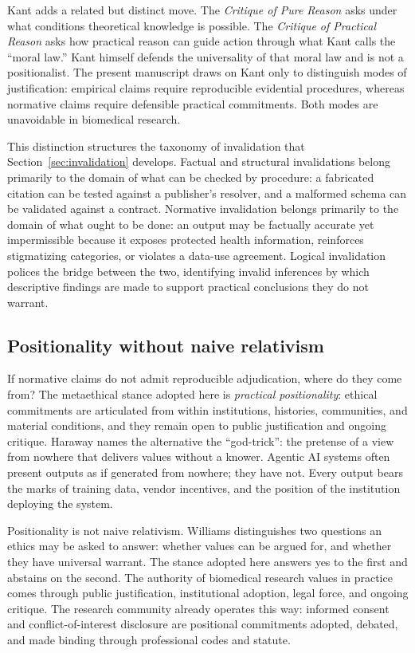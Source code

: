 \documentclass[11pt,letterpaper]{article}
\begin{document}
Kant adds a related but distinct move. The \emph{Critique of Pure Reason}
\cite{kant1781critique} asks under what conditions theoretical knowledge
is possible. The \emph{Critique of Practical Reason} \cite{kant1788practical}
asks how practical reason can guide action through what Kant calls the
``moral law.'' Kant himself defends the universality of that moral law
and is not a positionalist. The present manuscript draws on Kant only
to distinguish modes of justification: empirical claims require
reproducible evidential procedures, whereas normative claims require
defensible practical commitments. Both modes are unavoidable in
biomedical research.

This distinction structures the taxonomy of invalidation that
Section~\ref{sec:invalidation} develops. Factual and structural
invalidations belong primarily to the domain of what can be checked
by procedure: a fabricated citation can be tested against a publisher's
resolver, and a malformed schema can be validated against a contract.
Normative invalidation belongs primarily to the domain of what ought
to be done: an output may be factually accurate yet impermissible
because it exposes protected health information, reinforces
stigmatizing categories, or violates a data-use agreement. Logical
invalidation polices the bridge between the two, identifying invalid
inferences by which descriptive findings are made to support practical
conclusions they do not warrant.

\subsection{Positionality without naive relativism}
\label{sec:intro:positionality}

If normative claims do not admit reproducible adjudication, where do
they come from? The metaethical stance adopted here is
\emph{practical positionality}: ethical commitments are articulated
from within institutions, histories, communities, and material
conditions, and they remain open to public justification and ongoing
critique. Haraway \cite{haraway1988situated} names the alternative
the ``god-trick'': the pretense of a view from nowhere that delivers
values without a knower. Agentic AI systems often present outputs as
if generated from nowhere; they have not. Every output bears the marks
of training data, vendor incentives, and the position of the institution
deploying the system.

Positionality is not naive relativism. Williams \cite{williams1985ethics}
distinguishes two questions an ethics may be asked to answer: whether
values can be argued for, and whether they have universal warrant.
The stance adopted here answers yes to the first and abstains on the
second. The authority of biomedical research values in practice comes
through public justification, institutional adoption, legal force, and
ongoing critique. The research community already operates this way:
informed consent and conflict-of-interest disclosure are positional
commitments adopted, debated, and made binding through professional
codes and statute.
\end{document}
